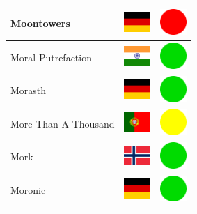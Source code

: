 \documentclass[12pt, a4paper, twoside]{report}
\begin{document}
\begin{center}
\begin{longtable}{|p{5cm}|p{2cm}|p{2cm}|}
 Moontowers                                                 & \includegraphics[width=1cm]{4x3/de} &   \includegraphics[width=1cm]{likes/n} \\ \hline
 Moral Putrefaction                                         & \includegraphics[width=1cm]{4x3/in} &   \includegraphics[width=1cm]{likes/y} \\ \hline
 Morasth                                                    & \includegraphics[width=1cm]{4x3/de} &   \includegraphics[width=1cm]{likes/y} \\ \hline
 More Than A Thousand                                       & \includegraphics[width=1cm]{4x3/pt} &   \includegraphics[width=1cm]{likes/m} \\ \hline
 Mork                                                       & \includegraphics[width=1cm]{4x3/no} &   \includegraphics[width=1cm]{likes/y} \\ \hline
 Moronic                                                    & \includegraphics[width=1cm]{4x3/de} &   \includegraphics[width=1cm]{likes/y} \\ \hline

\end{longtable}
\end{center}
\end{document}
